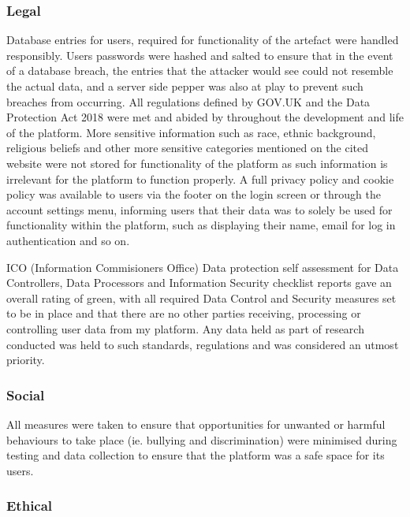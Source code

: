\documentclass[lettersize,journal]{IEEEtran}
\begin{document}
	\subsubsection{Legal}
        Database entries for users, required for functionality of the artefact were handled responsibly. Users passwords were hashed and salted to ensure that in
	the event of a database breach,	the entries that the attacker would see could not resemble the actual data, and a server side pepper was also at play to
	prevent such breaches from occurring. All regulations defined by GOV.UK and the Data Protection Act 2018 \cite{Gov UK Data Protection} were met and abided by throughout
        the development and life of the platform. More sensitive information such as race, ethnic background, religious beliefs and other more
        sensitive categories mentioned on the cited website were not stored for functionality of the platform as such information
        is irrelevant for the platform to function properly. A full privacy policy and cookie policy was available to users via the footer on the login screen or
	through the account settings menu, informing users that their data was to solely be used for functionality within the platform, such as displaying
	their name, email for log in authentication and so on.

        ICO (Information Commisioners Office) \cite{ICO} Data protection self assessment for Data Controllers, Data Processors and Information Security
        checklist reports gave an overall rating of green, with all required Data Control and Security measures set to be in place and that
        there are no other parties receiving, processing or controlling user data from my platform. Any data held as part of research conducted was held to such standards,
	regulations and was considered an utmost priority.

        \subsubsection{Social}
                All measures were taken to ensure that opportunities for unwanted or harmful behaviours to take place (ie. bullying and discrimination)
                were minimised during testing and data collection to ensure that the platform was a safe space for its users.

        \subsubsection{Ethical}
\end{document}
